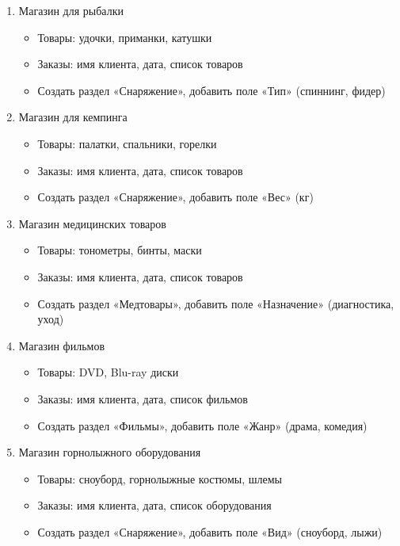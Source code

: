 \documentclass[12pt]{article}
\numberwithin{listing}{section}
\numberwithin{figure}{section}
\begin{document}
\begin{enumerate}
	\item Магазин для рыбалки
	      \begin{itemize}
		      \item Товары: удочки, приманки, катушки
		      \item Заказы: имя клиента, дата, список товаров
		      \item Создать раздел «Снаряжение», добавить поле «Тип» (спиннинг, фидер)
	      \end{itemize}

	\item Магазин для кемпинга
	      \begin{itemize}
		      \item Товары: палатки, спальники, горелки
		      \item Заказы: имя клиента, дата, список товаров
		      \item Создать раздел «Снаряжение», добавить поле «Вес» (кг)
	      \end{itemize}

	\item Магазин медицинских товаров
	      \begin{itemize}
		      \item Товары: тонометры, бинты, маски
		      \item Заказы: имя клиента, дата, список товаров
		      \item Создать раздел «Медтовары», добавить поле «Назначение» (диагностика, уход)
	      \end{itemize}

	      \newpage

	\item Магазин фильмов
	      \begin{itemize}
		      \item Товары: DVD, Blu-ray диски
		      \item Заказы: имя клиента, дата, список фильмов
		      \item Создать раздел «Фильмы», добавить поле «Жанр» (драма, комедия)
	      \end{itemize}

	\item Магазин горнолыжного оборудования
	      \begin{itemize}
		      \item Товары: сноуборд, горнолыжные костюмы, шлемы
		      \item Заказы: имя клиента, дата, список оборудования
		      \item Создать раздел «Снаряжение», добавить поле «Вид» (сноуборд, лыжи)
	      \end{itemize}

\end{enumerate}
\end{document}
